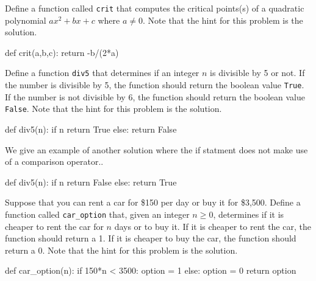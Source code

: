 \documentclass{ximera}
\begin{document}
\begin{question}
	Define a function called \verb|crit| that computes the critical points(s) of a quadratic polynomial $ax^2+bx+c$ where $a\neq 0$. Note that the hint for this problem is the solution.
	\begin{hint}
\begin{sageCell}
def crit(a,b,c):
        return -b/(2*a)
\end{sageCell}
	\end{hint}
\end{question}

\begin{question}
	Define a function \verb|div5| that determines if an integer $n$ is divisible by 5 or not. If the number is divisible by 5, the function should return the boolean value \verb|True|. If the number is not divisible by 6, the function should return the boolean value \verb|False|.  Note that the hint for this problem is the solution.
	\begin{hint}
\begin{sageCell}
def div5(n):
        if n%
                return True
        else:
                return False
\end{sageCell}
We give an example of another solution where the if statment does not make use of a comparison operator..

\begin{sageCell}
def div5(n):
        if n%
                return False
        else:
                return True
\end{sageCell}
	\end{hint}
\end{question}

\begin{question}
	Suppose that you can rent a car for \$150 per day or buy it for \$3,500. Define a function called \verb|car_option| that, given an integer $n\geq 0$, determines if it is cheaper to rent the car for $n$ days or to buy it. If it is cheaper to rent the car, the function should return a 1. If it is cheaper to buy the car, the function should return a 0. Note that the hint for this problem is the solution.
	\begin{hint}
\begin{sageCell}
def car_option(n):
        if 150*n < 3500:
                option = 1
        else:
                option = 0
        return option
\end{sageCell}
	\end{hint}
\end{question}
\end{document}
